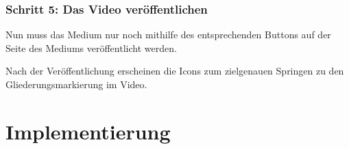 \documentclass[parskip=off,index=totocnumbered]{scrartcl}
\newenvironment{rückkeinstück2}
	{\begin{adjustwidth}{0cm}{0cm}\footnotesize \singlespace} 
	{\end{adjustwidth} \onehalfspacing}
\begin{document}

\subsubsection*{Schritt 5: Das Video veröffentlichen}
Nun muss das Medium nur noch mithilfe des entsprechenden Buttons auf der Seite des Mediums veröffentlicht werden.

\noindent \begin{minipage}{\textwidth}
    \vspace{0.6cm}
    \begin{rückkeinstück2}
        Nach der Veröffentlichung erscheinen die Icons zum zielgenauen Springen zu den Gliederungsmarkierung im Video.
    \end{rückkeinstück2}
\end{minipage}


\newpage


\section{Implementierung}
\end{document}
